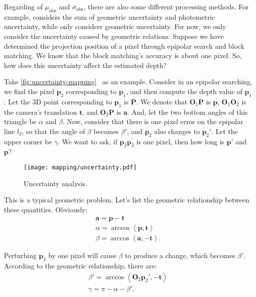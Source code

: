 Regarding of $\mu_{\mathrm{obs}}$ and $\sigma_{\mathrm{obs}}$, there are also some different processing methods. For example, \cite{Engel2013} considers the sum of geometric uncertainty and photometric uncertainty, while \cite{Vogiatzis2011} only considers geometric uncertainty. For now, we only consider the uncertainty caused by geometric relations. Suppose we have determined the projection position of a pixel through epipolar search and block matching. We know that the block matching's accuracy is about one pixel. So, how does this uncertainty affect the estimated depth?

Take \autoref{fig:uncertainty-mapping}~ as an example. Consider in an epipolar searching, we find the pixel $\mathbf{p}_2$ corresponding to $\mathbf{p}_1$, and then compute the depth value of $\mathbf{p}_1$. Let the 3D point corresponding to $\mathbf{ p}_1$ is $\mathbf{P}$. We denote that $\mathbf{O}_1 \mathbf{P}$ is $\mathbf{p}$, $\mathbf{O}_1 \mathbf{O}_2$ is the camera's translation $\mathbf{t} $, and $\mathbf{O}_2 \mathbf{P}$ is $\mathbf{a}$. And, let the two bottom angles of this triangle be $\alpha$ and $\beta$. Now, consider that there is one pixel error on the epipolar line $l_2$, so that the angle of $\beta$ becomes $\beta'$, and $\mathbf{p}_2$ also changes to $\mathbf{p }_2'$. Let the upper corner be $\gamma$. We want to ask, if $\mathbf{p}_2 \mathbf{p}_2^\prime $ is one pixel, then how long is $\mathbf{p}'$ and $\mathbf{p}$?

\begin{figure}[!ht]
	\centering
	\texttt{[image: mapping/uncertainty.pdf]}
	\caption{Uncertainty analysis.}
	\label{fig:uncertainty-mapping}
\end{figure}

This is a typical geometric problem. Let's list the geometric relationship between these quantities. Obviously:
\begin{equation}
	\begin{array}{l}
		\mathbf{a} = \mathbf{p} - \mathbf{t} \\
		\alpha  = \arccos \left\langle {\mathbf{p}, \mathbf{t}} \right\rangle \\
		\beta  = \arccos \left\langle {\mathbf{a}, - \mathbf{t}} \right\rangle .
	\end{array}
\end{equation}

Perturbing $\mathbf{p}_2$ by one pixel will cause $\beta$ to produce a change, which becomes $\beta'$. According to the geometric relationship, there are:
\begin{equation}
	\begin{array}{l}
		\beta ' = \arccos \left\langle {\mathbf{O}_2 \mathbf{p}_2', -\mathbf{t}} \right\rangle \\
		\gamma  = \pi  - \alpha  - \beta '.
	\end{array}
\end{equation}

